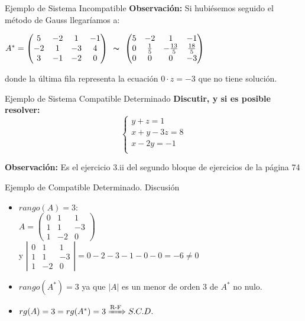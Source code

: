 \documentclass[11pt]{beamer}
\begin{document}
\begin{frame}{Ejemplo de Sistema Incompatible}
\textbf{Observación:} Si hubiésemos seguido el método de Gauss llegaríamos a:

$A^*=\left(\begin{matrix}5 & -2 & 1 & -1\\-2 & 1 & -3 & 4\\3 & -1 & -2 & 0\end{matrix}\right)\begin{array}{c}
     \thicksim   \\
     
    \end{array}
    \left(\begin{matrix}5 & -2 & 1 & -1\\0 & \frac{1}{5} & - \frac{13}{5} & \frac{18}{5}\\0 & 0 & 0 & -3\end{matrix}\right)$
    
    donde la última fila representa la ecuación $0\cdot z = -3$ que no tiene solución.
\end{frame}

\begin{frame}{Ejemplo de Sistema Compatible Determinado}
\textbf{Discutir, y si es posible resolver:
$$\left\{ \begin{matrix}y + z = 1 \\ x + y - 3 z = 8 \\ x - 2 y = -1 \\ \end{matrix}\right.$$}

\textbf{Observación:} Es el ejercicio 3.ii del segundo bloque de ejercicios de la página 74

\end{frame}


\begin{frame}{Ejemplo de Compatible Determinado. Discusión}
\begin{itemize}[<+->]
    \item $rango(A) =3$: \\  $A=\left(\begin{matrix}0 & 1 & 1\\1 & 1 & -3\\1 & -2 & 0\end{matrix}\right)$ \\ y $\left|\begin{matrix}0 & 1 & 1\\1 & 1 & -3\\1 & -2 & 0\end{matrix}\right| = 0-2-3-1-0-0=-6\neq0 $ 
    \item $rango(A^*) =3$ ya que $\left|A\right|$ es un menor de orden 3 de $A^*$ no nulo. 
    
    \item $rg(A)=3=rg(A^*)=3 \xRightarrow{\text{R-F}} S.C.D. $
\end{itemize}
\end{frame}
\end{document}
